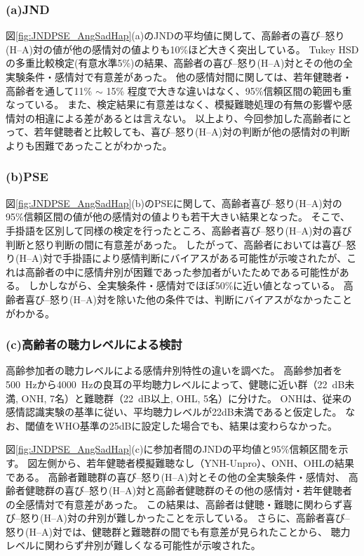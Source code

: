 \subsubsection{(a)JND}
図\ref{fig:JNDPSE_AngSadHap}(a)のJNDの平均値に関して、高齢者の喜び--怒り(H--A)対の値が他の感情対の値よりも10\%ほど大きく突出している。
Tukey HSDの多重比較検定(有意水準5\%)の結果、高齢者の喜び--怒り(H--A)対とその他の全実験条件・感情対で有意差があった。
他の感情対間に関しては、若年健聴者・高齢者を通して11\% $\sim$ 15\% 程度で大きな違いはなく、95\%信頼区間の範囲も重なっている。 
また、検定結果に有意差はなく、模擬難聴処理の有無の影響や感情対の相違による差があるとは言えない。
以上より、今回参加した高齢者にとって、若年健聴者と比較しても、喜び--怒り(H--A)対の判断が他の感情対の判断よりも困難であったことがわかった。

\subsubsection{(b)PSE}
図\ref{fig:JNDPSE_AngSadHap}(b)のPSEに関して、高齢者喜び--怒り(H--A)対の95\%信頼区間の値が他の感情対の値よりも若干大きい結果となった。
そこで、手掛語を区別して同様の検定を行ったところ、高齢者喜び--怒り(H--A)対の喜び判断と怒り判断の間に有意差があった。
したがって、高齢者においては喜び--怒り(H--A)対で手掛語により感情判断にバイアスがある可能性が示唆されたが、これは高齢者の中に感情弁別が困難であった参加者がいたためである可能性がある。
しかしながら、全実験条件・感情対でほぼ50\%に近い値となっている。
高齢者喜び--怒り(H--A)対を除いた他の条件では、判断にバイアスがなかったことがわかる。

\subsubsection{(c)高齢者の聴力レベルによる検討}
高齢参加者の聴力レベルによる感情弁別特性の違いを調べた。
高齢参加者を500~Hzから4000~Hzの良耳の平均聴力レベルによって、健聴に近い群（22~dB未満, ONH, 7名）と難聴群（22~dB以上, OHL, 5名）に分けた。
ONHは、従来の感情認識実験\cite{christensen2019effects}の基準に従い、平均聴力レベルが22dB未満であると仮定した。
なお、閾値をWHO基準の25dBに設定した場合でも、結果は変わらなかった。

図\ref{fig:JNDPSE_AngSadHap}(c)に参加者間のJNDの平均値と95\%信頼区間を示す。
図左側から、若年健聴者模擬難聴なし（YNH-Unpro）、ONH、OHLの結果である。
高齢者難聴群の喜び--怒り(H--A)対とその他の全実験条件・感情対、
高齢者健聴群の喜び--怒り(H--A)対と高齢者健聴群のその他の感情対・若年健聴者の全感情対で有意差があった。
この結果は、高齢者は健聴・難聴に関わらず喜び--怒り(H--A)対の弁別が難しかったことを示している。
さらに、高齢者喜び--怒り(H--A)対では、健聴群と難聴群の間でも有意差が見られたことから、
聴力レベルに関わらず弁別が難しくなる可能性が示唆された。





